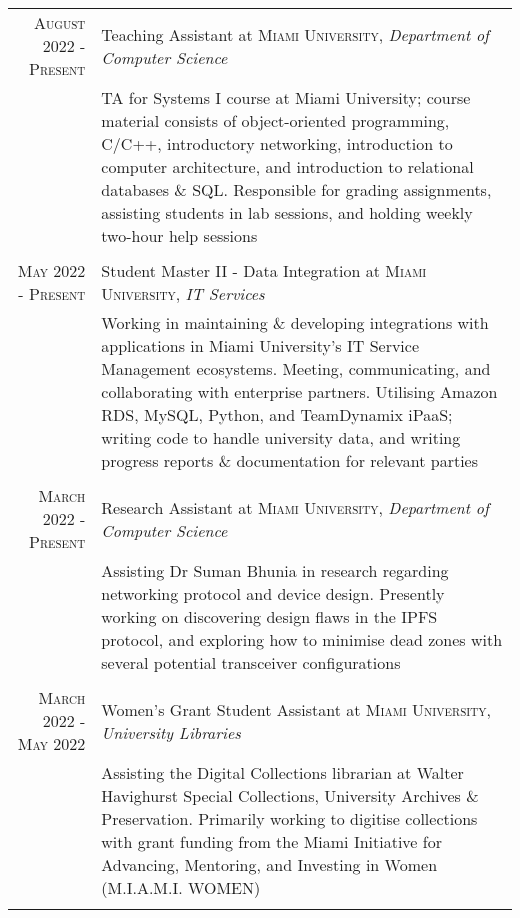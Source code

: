 \documentclass[letterpaper,8pt]{article} %
\begin{document}
\footnotesize{\begin{tabular}{r|p{12cm}}
\footnotesize{\textsc{August 2022 - Present}} & \footnotesize{Teaching Assistant at \textsc{Miami University}, \emph{Department of Computer Science}}\\
& \footnotesize{TA for Systems I course at Miami University; course material consists of object-oriented programming, C/C++, introductory networking, introduction to computer architecture, and introduction to relational databases \& SQL. Responsible for grading assignments, assisting students in lab sessions, and holding weekly two-hour help sessions}\\
\multicolumn{2}{c}{} \\


\footnotesize{\textsc{May 2022 - Present}} & \footnotesize{Student Master II - Data Integration at \textsc{Miami University}, \emph{IT Services}}\\
& \footnotesize{Working in maintaining \& developing integrations with applications in Miami University's IT Service Management ecosystems. Meeting, communicating, and collaborating with enterprise partners.
Utilising Amazon RDS, MySQL, Python, and TeamDynamix iPaaS; writing code to handle university data, and writing progress reports \& documentation for relevant parties}\\
\multicolumn{2}{c}{} \\


\footnotesize{\textsc{March 2022 - Present}} & \footnotesize{Research Assistant at \textsc{Miami University}, \emph{Department of Computer Science}}\\
& \footnotesize{Assisting Dr Suman Bhunia in research regarding networking protocol and device design. Presently working on discovering design flaws in the IPFS protocol, and exploring how to minimise dead zones with several potential transceiver configurations}\\
\multicolumn{2}{c}{} \\


\footnotesize{\textsc{March 2022 - May 2022}} & \footnotesize{Women's Grant Student Assistant at \textsc{Miami University}, \emph{University Libraries}}\\
& \footnotesize{Assisting the Digital Collections librarian at Walter Havighurst Special Collections, University Archives \& Preservation.
Primarily working to digitise collections with grant funding from the Miami Initiative for Advancing, Mentoring, and Investing in Women (M.I.A.M.I. WOMEN)}\\
\multicolumn{2}{c}{} \\


\end{tabular}}
\end{document}
